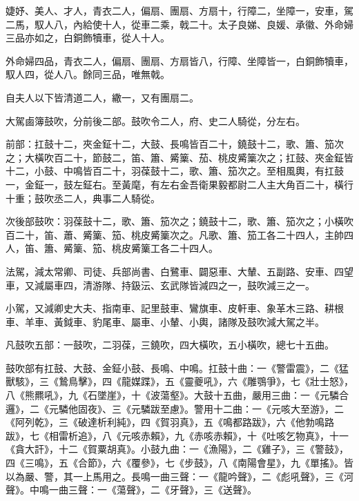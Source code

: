 \begin{pinyinscope}
 婕妤、美人、才人，青衣二人，偏扇、團扇、方扇十，行障二，坐障一，安車，駕二馬，馭人八，內給使十人，從車二乘，戟二十。太子良娣、良媛、承徽、外命婦三品亦如之，白銅飾犢車，從人十人。



 外命婦四品，青衣二人，偏扇、團扇、方扇皆八，行障、坐障皆一，白銅飾犢車，馭人四，從人八。餘同三品，唯無戟。



 自夫人以下皆清道二人，繖一，又有團扇二。



 大駕鹵簿鼓吹，分前後二部。鼓吹令二人，府、史二人騎從，分左右。



 前部：扛鼓十二，夾金鉦十二，大鼓、長鳴皆百二十，鐃鼓十二，歌、簫、笳次之；大橫吹百二十，節鼓二，笛、簫、觱篥、茄、桃皮觱篥次之；扛鼓、夾金鉦皆十二，小鼓、中鳴皆百二十，羽葆鼓十二，歌、簫、笳次之。至相風輿，有扛鼓一，金鉦一，鼓左鉦右。至黃麾，有左右金吾衛果毅都尉二人主大角百二十，橫行十重；鼓吹丞二人，典事二人騎從。



 次後部鼓吹：羽葆鼓十二，歌、簫、笳次之；鐃鼓十二，歌、簫、笳次之；小橫吹百二十，笛、蕭、觱篥、笳、桃皮觱篥次之。凡歌、簫、笳工各二十四人，主帥四人，笛、簫、觱篥、笳、桃皮觱篥工各二十四人。



 法駕，減太常卿、司徒、兵部尚書、白鷺車、闢惡車、大輦、五副路、安車、四望車，又減屬車四，清游隊、持鈒沄、玄武隊皆減四之一，鼓吹減三之一。



 小駕，又減卿史大夫、指南車、記里鼓車、鸞旗車、皮軒車、象革木三路、耕根車、羊車、黃鉞車、豹尾車、屬車、小輦、小輿，諸隊及鼓吹減大駕之半。



 凡鼓吹五部：一鼓吹，二羽葆，三鐃吹，四大橫吹，五小橫吹，總七十五曲。



 鼓吹部有扛鼓、大鼓、金鉦小鼓、長鳴、中鳴。扛鼓十曲：一《警雷震》，二《猛獸駭》，三《鷙鳥擊》，四《龍媒蹀》，五《靈夔吼》，六《雕鶚爭》，七《壯士怒》，八《熊羆吼》，九《石墜崖》，十《波蕩壑》。大鼓十五曲，嚴用三曲：一《元驎合邏》，二《元驎他固夜》、三《元驎跋至慮》。警用十二曲：一《元咳大至游》，二《阿列乾》，三《破達析利純》，四《賀羽真》，五《鳴都路跋》，六《他勃鳴路跋》，七《相雷析追》，八《元咳赤賴》，九《赤咳赤賴》，十《吐咳乞物真》，十一《貪大訐》，十二《賀粟胡真》。小鼓九曲：一《漁陽》，二《雞子》，三《警鼓》，四《三鳴》，五《合節》，六《覆參》，七《步鼓》，八《南陽會星》，九《單搖》。皆以為嚴、警，其一上馬用之。長鳴一曲三聲：一《龍吟聲》，二《彪吼聲》，三《河聲》。中鳴一曲三聲：一《蕩聲》，二《牙聲》，三《送聲》。




\end{pinyinscope}
